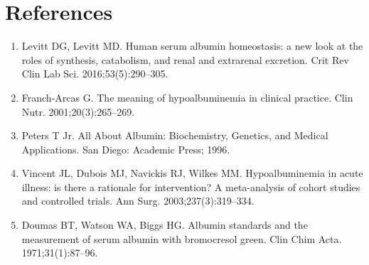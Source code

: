 \section*{References}
\begin{enumerate}
  \item Levitt DG, Levitt MD. Human serum albumin homeostasis: a new look at the roles of synthesis, catabolism, and renal and extrarenal excretion. Crit Rev Clin Lab Sci. 2016;53(5):290--305.
  \item Franch-Arcas G. The meaning of hypoalbuminemia in clinical practice. Clin Nutr. 2001;20(3):265--269.
  \item Peters T Jr. All About Albumin: Biochemistry, Genetics, and Medical Applications. San Diego: Academic Press; 1996.
  \item Vincent JL, Dubois MJ, Navickis RJ, Wilkes MM. Hypoalbuminemia in acute illness: is there a rationale for intervention? A meta-analysis of cohort studies and controlled trials. Ann Surg. 2003;237(3):319--334.
  \item Doumas BT, Watson WA, Biggs HG. Albumin standards and the measurement of serum albumin with bromocresol green. Clin Chim Acta. 1971;31(1):87--96.
\end{enumerate}
\clearpage
